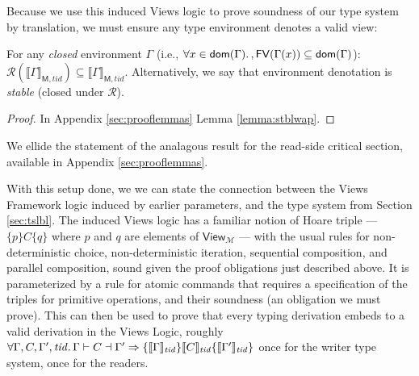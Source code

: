 
Because we use this induced Views logic to prove soundness of our type system by translation, we must ensure any type environment denotes a valid view:
\begin{lemma}\label{lemma:stblw}
For any \emph{closed} environment $\Gamma$ (i.e., $\forall x\in\mathsf{dom}(\Gamma)\ldotp, \mathsf{FV}(\Gamma(x))\subseteq\mathsf{dom}(\Gamma)$):
$
\mathcal{R}(\llbracket\Gamma\rrbracket_{\mathsf{M},tid})\subseteq\llbracket\Gamma\rrbracket_{\mathsf{M},tid}
$.
Alternatively, we say that environment denotation is \emph{stable} (closed under $\mathcal{R}$).
\end{lemma}
\begin{proof}
In Appendix \ref{sec:prooflemmas} Lemma \ref{lemma:stblwap}.
\end{proof}
We ellide the statement of the analagous result for the read-side critical section, available in Appendix \ref{sec:prooflemmas}.

With this setup done, we we can state the connection between the Views Framework logic induced by earlier parameters, and the type system from Section \ref{sec:tslbl}.
The induced Views logic has a familiar notion of Hoare triple --- $\{ p \} C \{ q \}$ where $p$ and $q$ are elements of $\mathsf{View}_\mathcal{M}$ --- with the usual rules for non-deterministic choice, non-deterministic iteration, sequential composition, and parallel composition, sound given the proof obligations just described above.  It is parameterized by a rule for atomic commands that requires a specification of the triples for primitive operations, and their soundness (an obligation we must prove).  This can then be used to prove that every typing derivation embeds to a valid derivation in the Views Logic, roughly
$\forall\Gamma,C,\Gamma',\mathit{tid}\ldotp\Gamma\vdash C\dashv \Gamma' \Rightarrow \{\llbracket\Gamma\rrbracket_\mathit{tid}\} \llbracket C\rrbracket_\mathit{tid}\{\llbracket\Gamma'\rrbracket_\mathit{tid}\}$
once for the writer type system, once for the readers.

